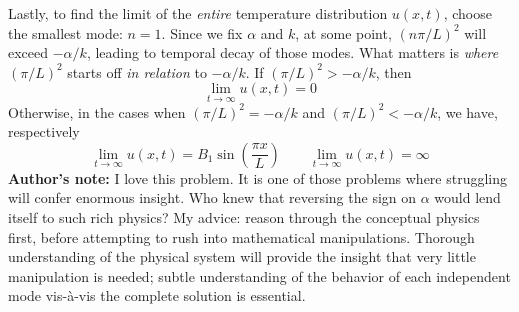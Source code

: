 \documentclass[a4paper]{article}
\begin{document}
\begin{enumerate}[label=(\alph*)]
	Lastly, to find the limit of the \textit{entire} temperature distribution \( u \!\left( x,t \right) \), choose the smallest mode: \( n = 1 \). Since we fix \( \alpha \) and \( k \), at some point, \( \!\left( n \pi / L \right)^{2} \) will exceed \( -\alpha / k \), leading to temporal decay of those modes. What matters is \textit{where} \( \!\left( \pi / L \right)^{2} \) starts off \textit{in relation} to \( -\alpha / k \). If \( \!\left( \pi / L \right)^{2} > -\alpha / k \), then
	\[
		\lim\limits_{t \to \infty} u \!\left( x,t \right) = 0 
	\]
	Otherwise, in the cases when \( \!\left( \pi / L \right)^{2} = -\alpha / k \) and \( \!\left( \pi / L \right)^{2} < -\alpha / k \), we have, respectively
	\[
		\lim\limits_{t \to \infty} u \!\left( x,t \right) = B_{1}\sin\!\left(\frac{\pi x}{L}\right) \qquad \lim\limits_{t \to \infty} u \!\left( x,t \right) = \infty
	\]
	\textbf{Author's note:} I love this problem. It is one of those problems where struggling will confer enormous insight. Who knew that reversing the sign on \( \alpha \) would lend itself to such rich physics? My advice: reason through the conceptual physics first, before attempting to rush into mathematical manipulations. Thorough understanding of the physical system will provide the insight that very little manipulation is needed; subtle understanding of the behavior of each independent mode vis-\`a-vis the complete solution is essential.
\end{enumerate}

\end{document}
